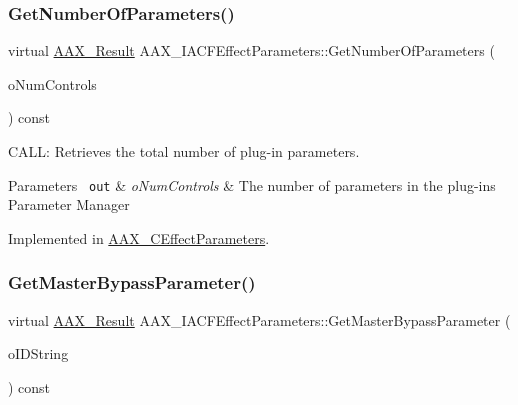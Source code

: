 \mbox{\label{a01669_a8af398b1e308849464aee5a6713a3965}} 
\subsubsection{\texorpdfstring{GetNumberOfParameters()}{GetNumberOfParameters()}}
{\footnotesize\ttfamily virtual \mbox{\hyperlink{a00392_a4d8f69a697df7f70c3a8e9b8ee130d2f}{A\+A\+X\+\_\+\+Result}} A\+A\+X\+\_\+\+I\+A\+C\+F\+Effect\+Parameters\+::\+Get\+Number\+Of\+Parameters (\begin{DoxyParamCaption}\item[{int32\+\_\+t $\ast$}]{o\+Num\+Controls }\end{DoxyParamCaption}) const\hspace{0.3cm}{\ttfamily [pure virtual]}}



C\+A\+LL\+: Retrieves the total number of plug-\/in parameters. 


\begin{DoxyParams}[1]{Parameters}
\mbox{\texttt{ out}}  & {\em o\+Num\+Controls} & The number of parameters in the plug-\/in\textquotesingle{}s Parameter Manager \\
\hline
\end{DoxyParams}


Implemented in \mbox{\hyperlink{a01481_ab22ac55f74401eddbe3f270435a74f70}{A\+A\+X\+\_\+\+C\+Effect\+Parameters}}.

\mbox{\label{a01669_ab967122337b61064492024f8bf695ed4}} 
\subsubsection{\texorpdfstring{GetMasterBypassParameter()}{GetMasterBypassParameter()}}
{\footnotesize\ttfamily virtual \mbox{\hyperlink{a00392_a4d8f69a697df7f70c3a8e9b8ee130d2f}{A\+A\+X\+\_\+\+Result}} A\+A\+X\+\_\+\+I\+A\+C\+F\+Effect\+Parameters\+::\+Get\+Master\+Bypass\+Parameter (\begin{DoxyParamCaption}\item[{\mbox{\hyperlink{a01873}{A\+A\+X\+\_\+\+I\+String}} $\ast$}]{o\+I\+D\+String }\end{DoxyParamCaption}) const\hspace{0.3cm}{\ttfamily [pure virtual]}}



